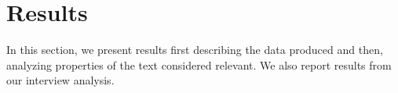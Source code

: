 
\section{Results}
\label{cp3:results}


In this section, we present results first describing the data produced
and 
then, analyzing properties of the text considered relevant. 
We also report results from our interview analysis.














